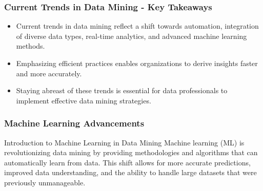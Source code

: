 \documentclass{beamer}
\begin{document}
\begin{frame}[fragile]
    \frametitle{Current Trends in Data Mining - Key Takeaways}
    \begin{itemize}
        \item Current trends in data mining reflect a shift towards automation, integration of diverse data types, real-time analytics, and advanced machine learning methods.
        \item Emphasizing efficient practices enables organizations to derive insights faster and more accurately.
        \item Staying abreast of these trends is essential for data professionals to implement effective data mining strategies.
    \end{itemize}
\end{frame}

\begin{frame}[fragile]
    \frametitle{Machine Learning Advancements}
    \begin{block}{Introduction to Machine Learning in Data Mining}
        Machine learning (ML) is revolutionizing data mining by providing methodologies and algorithms that can automatically learn from data. This shift allows for more accurate predictions, improved data understanding, and the ability to handle large datasets that were previously unmanageable.
    \end{block}
\end{frame}
\end{document}
